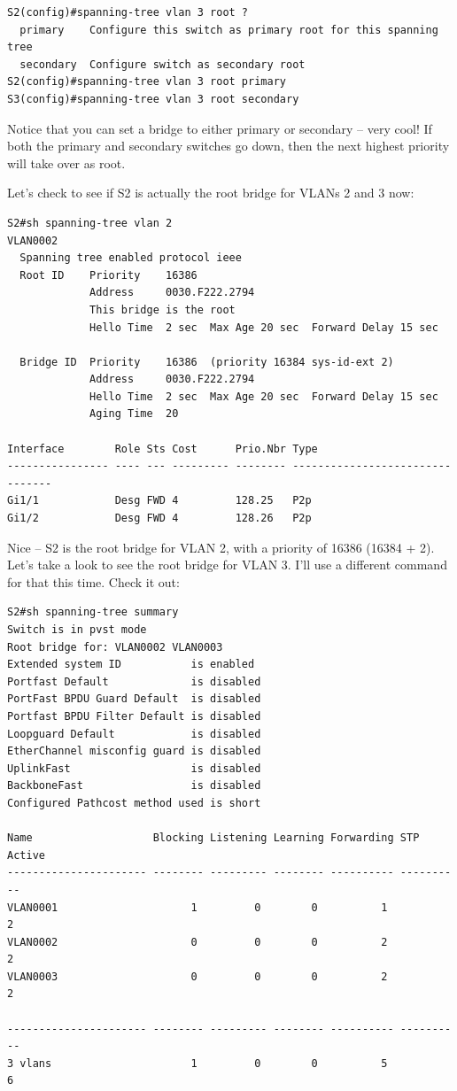 \begin{verbatim}
S2(config)#spanning-tree vlan 3 root ?
  primary    Configure this switch as primary root for this spanning tree
  secondary  Configure switch as secondary root
S2(config)#spanning-tree vlan 3 root primary
S3(config)#spanning-tree vlan 3 root secondary
\end{verbatim}

Notice that you can
set a bridge to either primary or secondary -- very cool! If both the
primary and secondary switches go down, then the next highest priority
will take over as root.

Let's check to see if S2 is actually the root bridge for VLANs 2 and 3
now:

\begin{verbatim}
S2#sh spanning-tree vlan 2
VLAN0002
  Spanning tree enabled protocol ieee
  Root ID    Priority    16386
             Address     0030.F222.2794
             This bridge is the root
             Hello Time  2 sec  Max Age 20 sec  Forward Delay 15 sec
 
  Bridge ID  Priority    16386  (priority 16384 sys-id-ext 2)
             Address     0030.F222.2794
             Hello Time  2 sec  Max Age 20 sec  Forward Delay 15 sec
             Aging Time  20
 
Interface        Role Sts Cost      Prio.Nbr Type
---------------- ---- --- --------- -------- --------------------------------
Gi1/1            Desg FWD 4         128.25   P2p
Gi1/2            Desg FWD 4         128.26   P2p
\end{verbatim}

Nice -- S2 is the root bridge for VLAN 2, with a priority of 16386 (16384
+ 2). Let's take a look to see the root bridge for VLAN 3. I'll use a
different command for that this time. Check it out:

\begin{verbatim}
S2#sh spanning-tree summary
Switch is in pvst mode
Root bridge for: VLAN0002 VLAN0003
Extended system ID           is enabled
Portfast Default             is disabled
PortFast BPDU Guard Default  is disabled
Portfast BPDU Filter Default is disabled
Loopguard Default            is disabled
EtherChannel misconfig guard is disabled
UplinkFast                   is disabled
BackboneFast                 is disabled
Configured Pathcost method used is short
 
Name                   Blocking Listening Learning Forwarding STP Active
---------------------- -------- --------- -------- ---------- ----------
VLAN0001                     1         0        0          1          2
VLAN0002                     0         0        0          2          2
VLAN0003                     0         0        0          2          2
 
---------------------- -------- --------- -------- ---------- ----------
3 vlans                      1         0        0          5          6
\end{verbatim}

